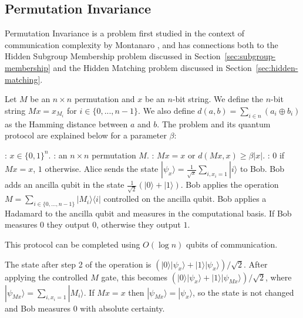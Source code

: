 \documentclass[a4paper]{article}
\begin{document}
        \subsection{Permutation Invariance}

        Permutation Invariance is a problem first studied in the context of communication complexity by Montanaro \cite{Montanaro:2011:NES:2230916.2230919}, and has connections both to the Hidden Subgroup Membership problem discussed in Section~\ref{sec:subgroup-membership} and the Hidden Matching problem discussed in Section~\ref{sec:hidden-matching}.

        Let $M$ be an $n \times n$ permutation and $x$ be an $n$-bit string. We define the $n$-bit string $Mx = x_{M_i}$ for $i \in \{0,...,n-1\}$. We also define $d(a, b) = \sum_{i \in n}(a_i \oplus b_i)$ as the Hamming distance between $a$ and $b$. The problem and its quantum protocol are explained below for a parameter $\beta$:

        \begin{codebox}
            \zi {}: $x \in \{0,1\}^n$.
            \zi {}: an $n\times n$ permutation $M$.
            \zi {}: $Mx = x$ or $d(Mx, x) \geq \beta|x|$.
            \zi {}: $0$ if $Mx = x$, $1$ otherwise.
            \li Alice sends the state $|\psi_x\rangle = \frac{1}{\sqrt{x}}\sum_{i, x_i=1}|i\rangle$ to Bob.
            \li Bob adds an ancilla qubit in the state $\frac{1}{\sqrt{2}}(|0\rangle + |1\rangle)$.
            \li Bob applies the operation $M = \sum_{i \in \{0,...,n-1\}}|M_i\rangle\langle i|$ controlled on the ancilla qubit.
            \li Bob applies a Hadamard to the ancilla qubit and measures in the computational basis.
            \li If Bob measures $0$ they output $0$, otherwise they output $1$.
        \end{codebox}

        This protocol can be completed using $O(\log n)$ qubits of communication.

        The state after step 2 of the operation is $(|0\rangle|\psi_x\rangle + |1\rangle|\psi_x\rangle)/\sqrt{2}$. After applying the controlled $M$ gate, this becomes $(|0\rangle|\psi_x\rangle + |1\rangle|\psi_{Mx}\rangle)/\sqrt{2}$, where $|\psi_{Mx}\rangle = \sum_{i, x_i = 1}|M_i\rangle$. If $Mx = x$ then $|\psi_{Mx}\rangle = |\psi_x\rangle$, so the state is not changed and Bob measures $0$ with absolute certainty.
\end{document}
